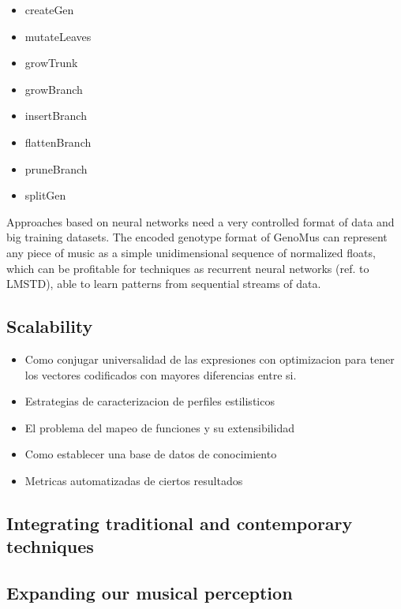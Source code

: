 \documentclass{article}
\begin{document}
\begin{itemize}
\item createGen
\item mutateLeaves
\item growTrunk
\item growBranch
\item insertBranch
\item flattenBranch
\item pruneBranch
\item splitGen

\end{itemize}

Approaches based on neural networks need a very controlled format of data and big training datasets. The encoded genotype format of GenoMus can represent any piece of music as a simple unidimensional sequence of normalized floats, which can be profitable for techniques as recurrent neural networks (ref. to LMSTD), able to learn patterns from sequential streams of data.


\subsection{Scalability}

{\color{gray}


\begin{itemize}
\item Como conjugar universalidad de las expresiones con optimizacion para tener los vectores codificados con mayores diferencias entre si.
\item Estrategias de caracterizacion de perfiles estilisticos
\item El problema del mapeo de funciones y su extensibilidad
\item Como establecer una base de datos de conocimiento
\item Metricas automatizadas de ciertos resultados
\end{itemize}

}


\subsection{Integrating traditional and contemporary techniques}

\subsection{Expanding our musical perception}
\end{document}
